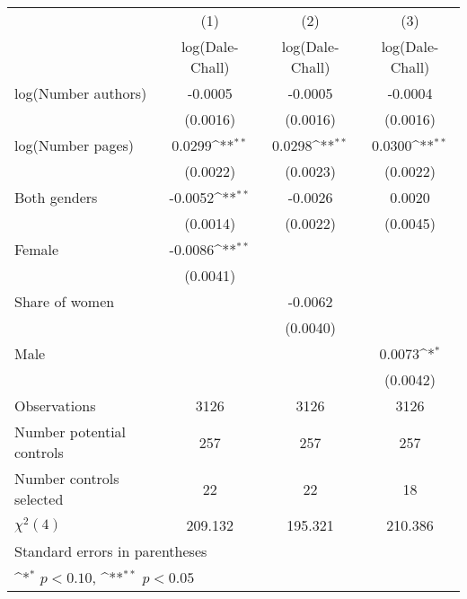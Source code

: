 {
\def\sym#1{\ifmmode^{#1}\else\(^{#1}\)\fi}
\begin{tabular}{l*{3}{c}}
\hline\hline
                    &\multicolumn{1}{c}{(1)}&\multicolumn{1}{c}{(2)}&\multicolumn{1}{c}{(3)}\\
                    &\multicolumn{1}{c}{log(Dale-Chall)}&\multicolumn{1}{c}{log(Dale-Chall)}&\multicolumn{1}{c}{log(Dale-Chall)}\\
\hline
\hspace{3mm}log(Number authors)&     -0.0005        &     -0.0005        &     -0.0004        \\
                    &    (0.0016)        &    (0.0016)        &    (0.0016)        \\
[1em]
\hspace{3mm}log(Number pages)&      0.0299\sym{**}&      0.0298\sym{**}&      0.0300\sym{**}\\
                    &    (0.0022)        &    (0.0023)        &    (0.0022)        \\
[1em]
\hspace{3mm}Both genders&     -0.0052\sym{**}&     -0.0026        &      0.0020        \\
                    &    (0.0014)        &    (0.0022)        &    (0.0045)        \\
[1em]
\hspace{3mm}Female  &     -0.0086\sym{**}&                    &                    \\
                    &    (0.0041)        &                    &                    \\
[1em]
\hspace{3mm}Share of women&                    &     -0.0062        &                    \\
                    &                    &    (0.0040)        &                    \\
[1em]
\hspace{3mm}Male    &                    &                    &      0.0073\sym{*} \\
                    &                    &                    &    (0.0042)        \\
\hline
Observations        &        3126        &        3126        &        3126        \\
Number potential controls&         257        &         257        &         257        \\
Number controls selected&          22        &          22        &          18        \\
$\chi^2(4)$         &     209.132        &     195.321        &     210.386        \\
\hline\hline
\multicolumn{4}{l}{\footnotesize Standard errors in parentheses}\\
\multicolumn{4}{l}{\footnotesize \sym{*} \(p<0.10\), \sym{**} \(p<0.05\)}\\
\end{tabular}
}

